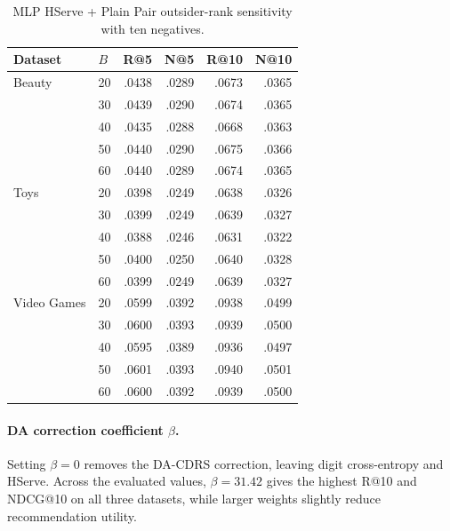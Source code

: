 \documentclass[sigconf, anonymous, review]{acmart}
\begin{document}
\begin{table}[t]
\centering
\caption{MLP HServe + Plain Pair outsider-rank sensitivity with ten negatives.}
\label{tab:sup-sensitive-b}
\fontsize{7.1}{8.5}\selectfont
\setlength{\tabcolsep}{2.4pt}
\begin{tabular}{@{}llrrrr@{}}
\toprule
Dataset & $B$ & R@5 & N@5 & R@10 & N@10 \\
\midrule
Beauty & 20 & .0438 & .0289 & .0673 & .0365 \\
 & 30 & .0439 & .0290 & .0674 & .0365 \\
 & 40 & .0435 & .0288 & .0668 & .0363 \\
 & 50 & .0440 & .0290 & .0675 & .0366 \\
 & 60 & .0440 & .0289 & .0674 & .0365 \\
\addlinespace[2pt]
Toys & 20 & .0398 & .0249 & .0638 & .0326 \\
 & 30 & .0399 & .0249 & .0639 & .0327 \\
 & 40 & .0388 & .0246 & .0631 & .0322 \\
 & 50 & .0400 & .0250 & .0640 & .0328 \\
 & 60 & .0399 & .0249 & .0639 & .0327 \\
\addlinespace[2pt]
Video Games & 20 & .0599 & .0392 & .0938 & .0499 \\
 & 30 & .0600 & .0393 & .0939 & .0500 \\
 & 40 & .0595 & .0389 & .0936 & .0497 \\
 & 50 & .0601 & .0393 & .0940 & .0501 \\
 & 60 & .0600 & .0392 & .0939 & .0500 \\
\bottomrule
\end{tabular}
\end{table}

\paragraph{DA correction coefficient $\beta$.}
Setting $\beta=0$ removes the DA-CDRS correction, leaving
digit cross-entropy and HServe. Across the evaluated values,
$\beta=31.42$ gives the highest R@10 and NDCG@10 on
all three datasets, while larger weights slightly reduce
recommendation utility.
\end{document}
